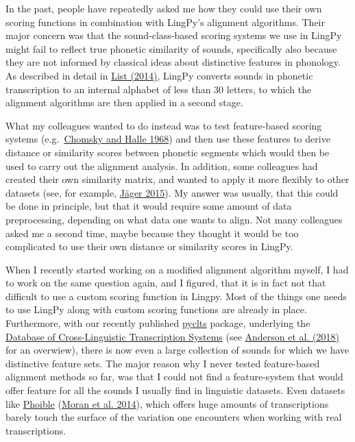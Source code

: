 \documentclass[
  a4paper,
  14pt,
  oneside,
  tablecaptionabove
]{scrbook}
\begin{document}
In the past, people have repeatedly asked me how they could use their
own scoring functions in combination with LingPy's alignment algorithms.
Their major concern was that the sound-class-based scoring systems we
use in LingPy might fail to reflect true phonetic similarity of sounds,
specifically also because they are not informed by classical ideas about
distinctive features in phonology. As described in detail in
\href{http://bibliography.lingpy.org?key=List2014d}{List (2014)},
LingPy converts sounds in phonetic transcription to an internal alphabet
of less than 30 letters, to which the alignment algorithms are then
applied in a second stage.

What my colleagues wanted to do instead was to test feature-based
scoring systems
(e.g.~\href{http://bibliography.lingpy.org?key=Chomsky1968}{Chomsky and
Halle 1968}) and then use these features to derive distance or
similarity scores between phonetic segments which would then be used to
carry out the alignment analysis. In addition, some colleagues had
created their own similarity matrix, and wanted to apply it more
flexibly to other datasets (see, for example,
\href{http://bibliography.lingpy.org?key=Jaeger2015}{Jäger 2015}). My
answer was usually, that this could be done in principle, but that it
would require some amount of data preprocessing, depending on what data
one wants to align. Not many colleagues asked me a second time, maybe
because they thought it would be too complicated to use their own
distance or similarity scores in LingPy.

When I recently started working on a modified alignment algorithm
myself, I had to work on the same question again, and I figured, that it
is in fact not that difficult to use a custom scoring function in
Lingpy. Most of the things one needs to use LingPy along with custom
scoring functions are already in place. Furthermore, with our recently
published \href{https://github.com/cldf/clts}{pyclts} package,
underlying the \href{https://clts.clld.org}{Database of Cross-Linguistic
Transcription Systems} (see
\href{http://bibliography.lingpy.org?key=Anderson2018}{Anderson et al.
(2018)} for an overwiew), there is now even a large collection of sounds
for which we have distinctive feature sets. The major reason why I never
tested feature-based alignment methods so far, was that I could not find
a feature-system that would offer feature for all the sounds I usually
find in linguistic datasets. Even datasets like
\href{https://phoible.org}{Phoible} (\href{http://bibliography.lingpy.org?key=Moran2014}{Moran et al. 2014}), which offers huge amounts of transcriptions barely touch the surface
of the variation one encounters when working with real transcriptions.
\end{document}
